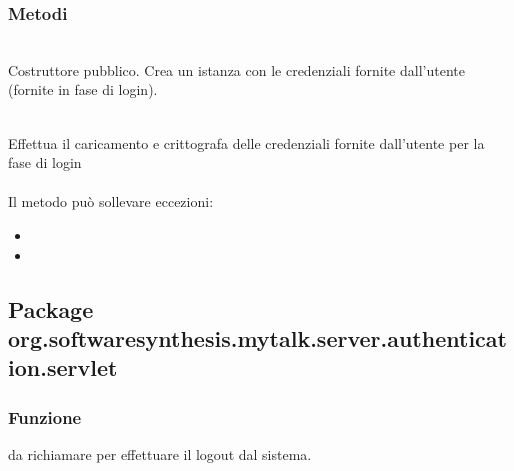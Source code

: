 \subsubsection*{Metodi}
\begin{description}
	\item{}\\
	Costruttore pubblico. Crea un istanza con le credenziali fornite dall'utente (fornite in fase di login).

	\item{}\\
	Effettua il caricamento e crittografa delle credenziali fornite dall'utente per la fase di login\\\\
	Il metodo può sollevare eccezioni:
	\begin{itemize}
		\item {}
		\item {}
	\end{itemize}

\end{description}

\subsection{Package org.softwaresynthesis.mytalk.server.authentication.servlet}\label{sec:autservlet}


\subsubsection*{Funzione}
 da richiamare per effettuare il logout dal sistema.

